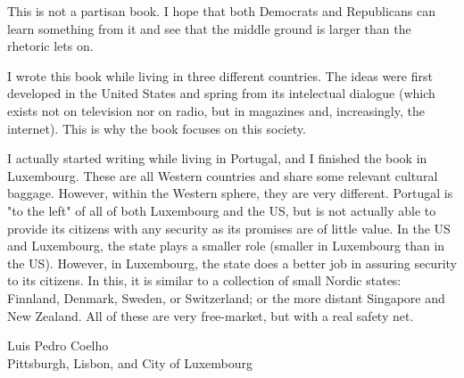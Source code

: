 This is not a partisan book. I hope that both Democrats and Republicans can
learn something from it and see that the middle ground is larger than the
rhetoric lets on.

\bigskip
\bigskip
\bigskip

I wrote this book while living in three different countries. The ideas were
first developed in the United States and spring from its intelectual dialogue
(which exists not on television nor on radio, but in magazines and,
increasingly, the internet). This is why the book focuses on this society.

I actually started writing while living in Portugal, and I finished the book in
Luxembourg. These are all Western countries and share some relevant cultural
baggage. However, within the Western sphere, they are very different. Portugal
is "to the left" of all of both Luxembourg and the US, but is not actually able
to provide its citizens with any security as its promises are of little value.
In the US and Luxembourg, the state plays a smaller role (smaller in Luxembourg
than in the US). However, in Luxembourg, the state does a better job in
assuring security to its citizens.  In this, it is similar to a collection of
small Nordic states: Finnland, Denmark, Sweden, or Switzerland; or the more
distant Singapore and New Zealand.  All of these are very free-market, but with
a real safety net.

\begin{flushright}
Luis Pedro Coelho\\
Pittsburgh, Lisbon, and City of Luxembourg
\end{flushright}

